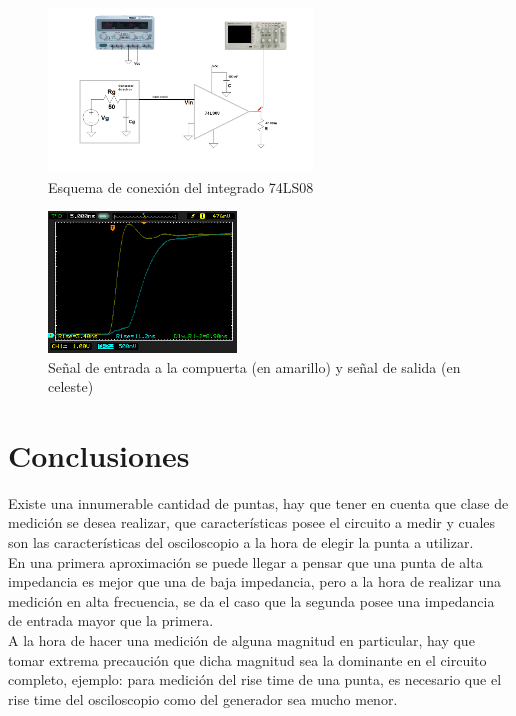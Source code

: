 \documentclass[a4paper,10pt]{article}
\begin{document}
				\begin{figure}[!htb]
						\centering
						\includegraphics[width=7cm]
						{Imagenes/banco.png}
						\caption{Esquema de conexi\'on del integrado 74LS08}
						\label{banco}
					\end{figure}
				
				\begin{figure}[!htb]
					\centering
					\includegraphics[width=5cm]
					{Imagenes/Risetime3.png}
					\caption{Se\~nal de entrada a la compuerta (en amarillo) y se\~nal 
					de salida (en celeste)}
					\label{img009}
				\end{figure}

	\newpage
	\section{Conclusiones}
	\indent Existe una innumerable cantidad de puntas, hay que tener en cuenta
	que clase de medición se desea realizar, que características posee el 
	circuito a medir y cuales son las características del osciloscopio a la 
	hora de elegir la punta a utilizar. \\
	\indent En una primera aproximación se puede llegar a pensar que una punta
	de alta impedancia es mejor que una de baja impedancia, pero a la hora de
	realizar una medición en alta frecuencia, se da el caso que la segunda 
	posee una impedancia de entrada mayor que la primera.\\
	\indent A la hora de hacer una medición de alguna magnitud en particular,
	hay que tomar extrema precaución que dicha magnitud sea la dominante en el
	circuito completo, ejemplo: para medición del rise time de una punta, es 
	necesario que el rise time del osciloscopio como del generador sea mucho 
	menor. 
	
\end{document}
